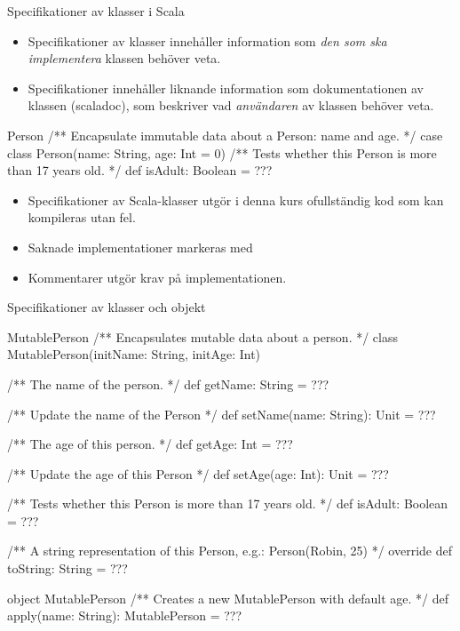 


\begin{Slide}{Specifikationer av klasser i Scala}\footnotesize
\begin{itemize}
\item Specifikationer av klasser innehåller information som \emph{den som ska implementera} klassen behöver veta.
\item Specifikationer innehåller liknande information som dokumentationen av klassen (scaladoc), som beskriver vad \emph{användaren} av klassen behöver veta.  
\end{itemize}
\begin{ScalaSpec}{Person}
/** Encapsulate immutable data about a Person: name and age. */ 
case class Person(name: String, age: Int = 0){
  /** Tests whether this Person is more than 17 years old. */
  def isAdult: Boolean = ???
}
\end{ScalaSpec}
\begin{itemize}
\item Specifikationer av Scala-klasser utgör i denna kurs ofullständig kod som kan kompileras utan fel. 
\item Saknade implementationer markeras med 
\item Kommentarer utgör krav på implementationen.
\end{itemize}

\end{Slide}


\begin{Slide}{Specifikationer av klasser och objekt}
\begin{ScalaSpec}{MutablePerson}
/** Encapsulates mutable data about a person. */
class MutablePerson(initName: String, initAge: Int){
  /** The name of the person. */
  def getName: String = ???
  
  /** Update the name of the Person */
  def setName(name: String): Unit = ???

  /** The age of this person. */
  def getAge: Int = ???

  /** Update the age of this Person */
  def setAge(age: Int): Unit = ???

  /** Tests whether this Person is more than 17 years old. */
  def isAdult: Boolean = ???

  /** A string representation of this Person, e.g.: Person(Robin, 25) */
  override def toString: String = ???
}
object MutablePerson {
  /** Creates a new MutablePerson with default age. */
  def apply(name: String): MutablePerson = ???
}
\end{ScalaSpec}

\end{Slide}

